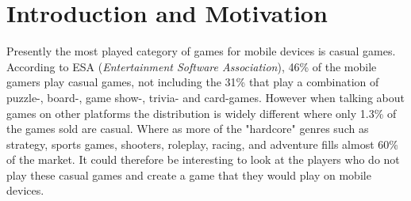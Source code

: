 \chapter{Introduction and Motivation}
Presently the most played category of games for mobile devices is casual games.
According to ESA\cite{ESA}\cite{ESApdf} (\textit{Entertainment Software Association}), 46\% of the mobile gamers play casual games, not including the 31\% that play a combination of puzzle-, board-, game show-, trivia- and card-games.
However when talking about games on other platforms the distribution is widely different where only 1.3\% of the games sold are casual.
Where as more of the "hardcore" genres such as strategy, sports games, shooters, roleplay, racing, and adventure fills almost 60\% of the market.
It could therefore be interesting to look at the players who do not play these casual games and create a game that they would play on mobile devices.

\label{sec:specifyingtheproblemstatement}



%
